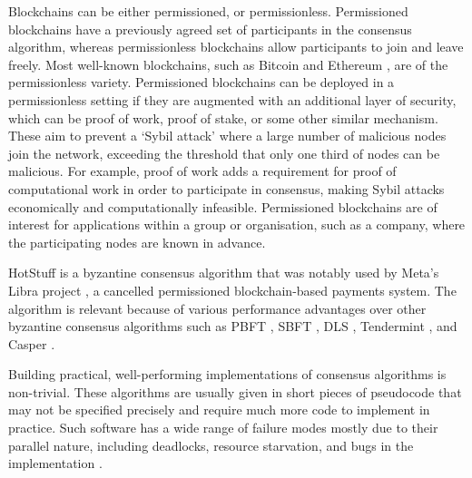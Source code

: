 Blockchains can be either permissioned, or permissionless. Permissioned blockchains have a previously agreed set of participants in the consensus algorithm, whereas permissionless blockchains allow participants to join and leave freely. Most well-known blockchains, such as Bitcoin \cite{nakamoto_bitcoin_nodate} and Ethereum \cite{wood_ethereum_nodate}, are of the permissionless variety. Permissioned blockchains can be deployed in a permissionless setting if they are augmented with an additional layer of security, which can be proof of work, proof of stake, or some other similar mechanism. These aim to prevent a `Sybil attack' where a large number of malicious nodes join the network, exceeding the threshold that only one third of nodes can be malicious. For example, proof of work adds a requirement for proof of computational work in order to participate in consensus, making Sybil attacks economically and computationally infeasible. Permissioned blockchains are of interest for applications within a group or organisation, such as a company, where the participating nodes are known in advance.

HotStuff is a byzantine consensus algorithm that was notably used by Meta's Libra project \cite{baudet_state_nodate}, a cancelled permissioned blockchain-based payments system. The algorithm is relevant because of various performance advantages over other byzantine consensus algorithms such as PBFT \cite{castro_practical_nodate}, SBFT \cite{golan_gueta_sbft_2019}, DLS \cite{dwork_consensus_nodate}, Tendermint \cite{kwon_tendermint_nodate}, and Casper \cite{buterin_casper_2019}.

Building practical, well-performing implementations of consensus algorithms is non-trivial. These algorithms are usually given in short pieces of pseudocode that may not be specified precisely and require much more code to implement in practice. Such software has a wide range of failure modes mostly due to their parallel nature, including deadlocks, resource starvation, and bugs in the implementation \cite{chubby}.

